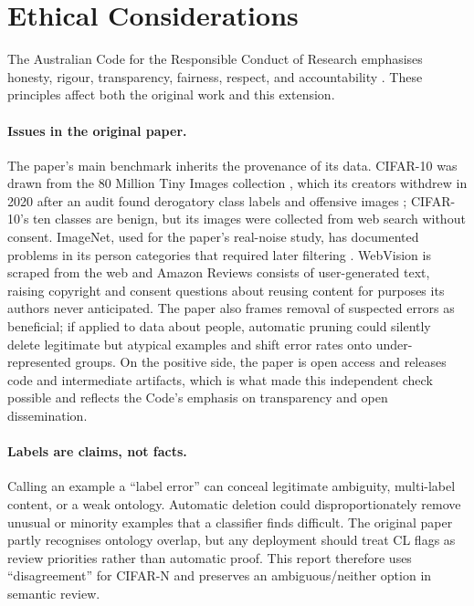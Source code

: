 \documentclass[11pt]{article}
\begin{document}
\section{Ethical Considerations}

The Australian Code for the Responsible Conduct of Research emphasises
honesty, rigour, transparency, fairness, respect, and accountability
\citep{australiancode2018}. These principles affect both the original work and
this extension.

\paragraph{Issues in the original paper.}
The paper's main benchmark inherits the provenance of its data. CIFAR-10 was
drawn from the 80 Million Tiny Images collection \citep{torralba2008tiny},
which its creators withdrew in 2020 after an audit found derogatory class
labels and offensive images \citep{prabhu2021pyrrhic}; CIFAR-10's ten classes
are benign, but its images were collected from web search without consent.
ImageNet, used for the paper's real-noise study, has documented problems in
its person categories that required later filtering \citep{yang2020fairer}.
WebVision is scraped from the web and Amazon Reviews consists of
user-generated text, raising copyright and consent questions about reusing
content for purposes its authors never anticipated. The paper also frames
removal of suspected errors as beneficial; if applied to data about people,
automatic pruning could silently delete legitimate but atypical examples and
shift error rates onto under-represented groups. On the positive side, the
paper is open access and releases code and intermediate artifacts, which is
what made this independent check possible and reflects the Code's emphasis
on transparency and open dissemination.

\paragraph{Labels are claims, not facts.}
Calling an example a ``label error'' can conceal legitimate ambiguity,
multi-label content, or a weak ontology. Automatic deletion could
disproportionately remove unusual or minority examples that a classifier finds
difficult. The original paper partly recognises ontology overlap, but any
deployment should treat CL flags as review priorities rather than automatic
proof. This report therefore uses ``disagreement'' for CIFAR-N and preserves an
ambiguous/neither option in semantic review.
\end{document}
